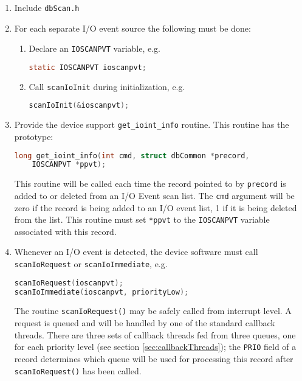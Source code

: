 \begin{enumerate}
\item Include \verb|dbScan.h|

\item For each separate I/O event source the following must be done:

\begin{enumerate}

\item Declare an \verb|IOSCANPVT| variable, e.g.

\begin{lstlisting}[language=C]
static IOSCANPVT ioscanpvt;
\end{lstlisting}

\item Call \verb|scanIoInit| during initialization, e.g.

\begin{lstlisting}[language=C]
scanIoInit(&ioscanpvt);
\end{lstlisting}
\end{enumerate}

\item Provide the device support \verb|get_ioint_info| routine.
This routine has the prototype:

\begin{lstlisting}[language=C]
long get_ioint_info(int cmd, struct dbCommon *precord,
    IOSCANPVT *ppvt);
\end{lstlisting}

This routine will be called each time the record pointed to by \verb|precord| is added to or deleted from an I/O Event scan list.
The \verb|cmd| argument will be zero if the record is being added to an I/O event list, 1 if it is being deleted from the list.
This routine must set \verb|*ppvt| to the \verb|IOSCANPVT| variable associated with this record.

\item Whenever an I/O event is detected, the device software must call \verb|scanIoRequest| or \verb|scanIoImmediate|, e.g.

\begin{lstlisting}[language=C]
scanIoRequest(ioscanpvt);
scanIoImmediate(ioscanpvt, priorityLow);
\end{lstlisting}

The routine \verb|scanIoRequest()| may be safely called from interrupt level.
A request is queued and will be handled by one of the standard callback threads.
There are three sets of callback threads fed from three queues, one for each priority level (see section \ref{sec:callbackThreads}); the \verb|PRIO| field of a record determines which queue will be used for processing this record after \verb|scanIoRequest()| has been called.


\end{enumerate}
